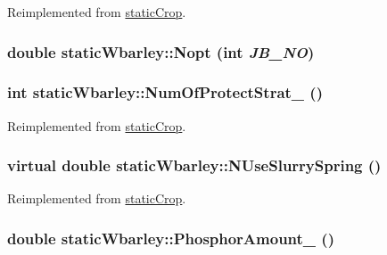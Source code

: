 Reimplemented from \hyperlink{classstatic_crop_a32b69ed138beaed150efa74d18e82d8e}{staticCrop}.\hypertarget{classstatic_wbarley_aad6467e5da8fe1083d81d3534d3aee0f}{
\subsubsection[{Nopt}]{\setlength{\rightskip}{0pt plus 5cm}double staticWbarley::Nopt (int {\em JB\_\-NO})}}
\label{classstatic_wbarley_aad6467e5da8fe1083d81d3534d3aee0f}
\hypertarget{classstatic_wbarley_a2c42b2ae215233e89c866bdf9bb8b395}{
\subsubsection[{NumOfProtectStrat\_\-}]{\setlength{\rightskip}{0pt plus 5cm}int staticWbarley::NumOfProtectStrat\_\- ()}}
\label{classstatic_wbarley_a2c42b2ae215233e89c866bdf9bb8b395}


Reimplemented from \hyperlink{classstatic_crop_a4d3d767f569f48eb68ffa76822302467}{staticCrop}.\hypertarget{classstatic_wbarley_a13213cb1959283fc557cb0ff49e8c587}{
\subsubsection[{NUseSlurrySpring}]{\setlength{\rightskip}{0pt plus 5cm}virtual double staticWbarley::NUseSlurrySpring ()}}
\label{classstatic_wbarley_a13213cb1959283fc557cb0ff49e8c587}


Reimplemented from \hyperlink{classstatic_crop_ae7d21ab4afc8d8355d231566e8d87b1b}{staticCrop}.\hypertarget{classstatic_wbarley_a35b376e9216edc2f8ac37916e657308f}{
\subsubsection[{PhosphorAmount\_\-}]{\setlength{\rightskip}{0pt plus 5cm}double staticWbarley::PhosphorAmount\_\- ()}}
\label{classstatic_wbarley_a35b376e9216edc2f8ac37916e657308f}


